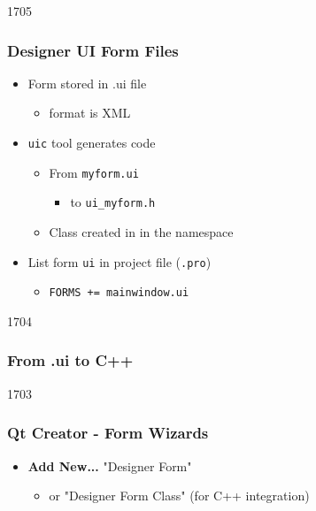 \begin{slide}[fragile]{1705}
\frametitle{Designer UI Form Files}
\begin{itemize}
\item Form stored in .ui file
  \begin{itemize}
  \item format is XML 
  \end{itemize}
\end{itemize}
\begin{itemize}
\item \texttt{uic} tool generates code
  \begin{itemize}
  \item From \texttt{myform.ui}
    \begin{itemize}
    \item to \texttt{ui\_myform.h}
    \end{itemize}
  \item Class created in in the  namespace
  \end{itemize}
\item List form \texttt{ui} in project file (\texttt{.pro})
  \begin{itemize}
  \item \texttt{FORMS += mainwindow.ui}
  \end{itemize}
\end{itemize}
\end{slide}

\begin{slide}[fragile]{1704}
\frametitle{From .ui to C++}
\end{slide}

\begin{slide}[fragile]{1703}
\frametitle{Qt Creator - Form Wizards}
\begin{itemize}
\item \textbf{Add New...} "Designer Form"
  \begin{itemize}
  \item or "Designer Form Class" (for C++ integration)
  \end{itemize}
\end{itemize}
\medskip
{}
\end{slide}

